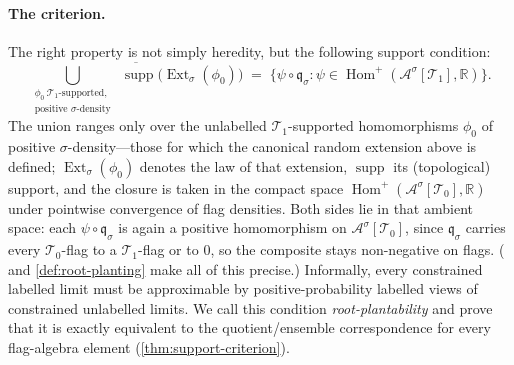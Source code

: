 \documentclass[11pt]{article}
\theoremstyle{definition}
\newcommand{\R}{\mathbb{R}}
\newcommand{\A}{\mathcal{A}}
\newcommand{\T}{\mathcal{T}}
\newcommand{\Homp}{\operatorname{Hom}^{+}}
\newcommand{\Ext}{\operatorname{Ext}}
\newcommand{\supp}{\operatorname{supp}}
\newcommand{\qmap}{\mathfrak q}
\begin{document}
\paragraph{The criterion.}
The right property is not simply heredity, but the following support
condition:
\[
  \overline{\bigcup_{\substack{\phi_0\ \T_1\text{-supported,}\\ \text{positive }\sigma\text{-density}}}\;\supp\bigl(\Ext_\sigma(\phi_0)\bigr)}
  \;=\;
  \{\psi\circ\qmap_\sigma:\psi\in\Homp(\A^\sigma[\T_1],\R)\}.
\]
The union ranges only over the unlabelled $\T_1$-supported homomorphisms $\phi_0$ of
positive $\sigma$-density---those for which the canonical random extension above is
defined; $\Ext_\sigma(\phi_0)$ denotes the law of that extension, $\supp$ its
(topological) support, and the closure is taken in the compact space
$\Homp(\A^\sigma[\T_0],\R)$ under pointwise convergence of flag densities.  Both sides lie
in that ambient space: each $\psi\circ\qmap_\sigma$ is again a positive homomorphism on
$\A^\sigma[\T_0]$, since $\qmap_\sigma$ carries every $\T_0$-flag to a $\T_1$-flag or to
$0$, so the composite stays non-negative on flags.  ( and
\cref{def:root-planting} make all of this precise.)  Informally, every constrained
labelled limit must be approximable by positive-probability labelled views of constrained
unlabelled limits.  We call this condition \emph{root-plantability} and prove that it is
exactly equivalent to the quotient/ensemble correspondence for every flag-algebra element
(\cref{thm:support-criterion}).
\end{document}
